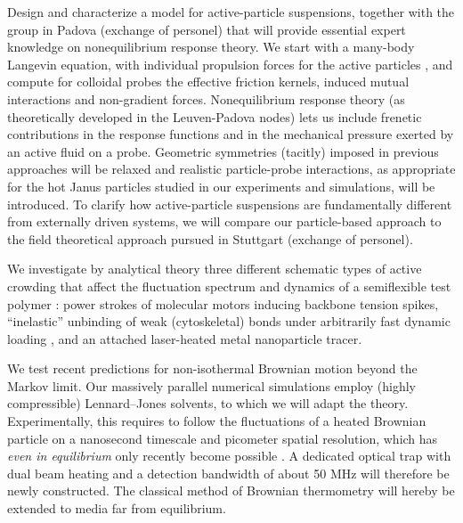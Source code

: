 \begin{workpackage}
\begin{tasklist}

\begin{task}[title=Nonequilibrium equations of state (NEOS),id=task1,lead=ULEI,partners={UNIPD,USTUTT,KUL},
wphases={0-12,12-40!0.5,24-30,36-38}]
Design and characterize a model for active-particle suspensions, together with the group
in Padova (exchange of personel) that will provide essential expert knowledge on
nonequilibrium response theory.
%
We start with a many-body Langevin equation, with individual propulsion forces for the
active particles \cite{solon-etal:2015}, and compute for colloidal probes the effective
friction kernels, induced mutual interactions and non-gradient forces.
%
Nonequilibrium response theory (as theoretically developed in the Leuven-Padova nodes) lets us include 
frenetic contributions in the response functions \cite{baiesi-wynants:2009} and in the mechanical pressure 
exerted by an active fluid on a probe. 
%
Geometric symmetries (tacitly) imposed in previous approaches will be relaxed and realistic particle-probe interactions, 
as appropriate for the hot Janus particles studied in our experiments and simulations, will be introduced.
%
To clarify how active-particle suspensions are fundamentally different from externally driven systems,
we will compare our particle-based approach to the field theoretical approach pursued in Stuttgart (exchange of personel). 

\end{task}

\begin{task}[title=Active Crowding,id=task2,lead=ULEI,partners={KUL},wphases=0-40!0.5]
We investigate by analytical theory three different schematic types of active crowding 
that affect the fluctuation spectrum and dynamics of a semiflexible test polymer \cite{otto-etal:2013}: 
power strokes of molecular motors inducing backbone tension spikes,
``inelastic'' \cite{gralka-kroy:2015}unbinding of weak (cytoskeletal) bonds under 
arbitrarily fast dynamic loading \cite{bullerjahn-sturm-kroy:2014}, and an attached laser-heated metal nanoparticle tracer.
\end{task}

\begin{task}[title=Noise Temperature,id=task3,lead=ULEI,wphases=0-32!0.5]
We test recent predictions for non-isothermal Brownian motion \cite{rings-etal:2010,falasco-etal:2014}  
beyond the Markov limit. Our massively parallel numerical simulations \cite{chakraborty-etal:2011} 
employ (highly compressible) Lennard--Jones solvents, to which we will adapt the theory.
Experimentally, this requires to follow the fluctuations of 
a heated Brownian particle on a nanosecond timescale and picometer spatial resolution, which has
\emph{even in equilibrium} only recently become possible  \cite{kheifets-etal:2014}.
%
A dedicated optical trap with dual beam heating and a detection bandwidth of about 50 MHz
will therefore be newly constructed. 
%
The classical method of Brownian thermometry will hereby be extended to media far from equilibrium.
\end{task}


\end{tasklist}
\end{workpackage}
